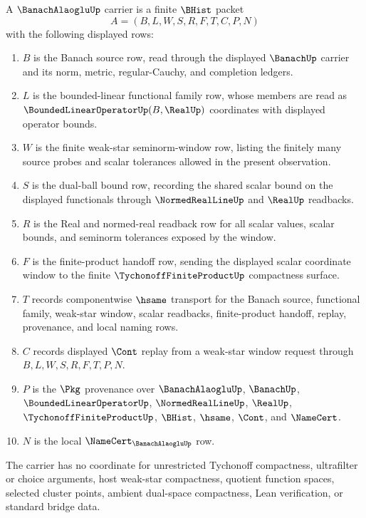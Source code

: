 \begin{definition}
\label{def:banach-alaoglu-carrier}
A $\BanachAlaogluUp$ carrier is a finite $\BHist$ packet
$$
A=(B,L,W,S,R,F,T,C,P,N)
$$
with the following displayed rows:
\begin{enumerate}
\item $B$ is the Banach source row, read through the displayed $\BanachUp$ carrier and its norm, metric, regular-Cauchy, and completion ledgers.
\item $L$ is the bounded-linear functional family row, whose members are read as $\BoundedLinearOperatorUp(B,\RealUp)$ coordinates with displayed operator bounds.
\item $W$ is the finite weak-star seminorm-window row, listing the finitely many source probes and scalar tolerances allowed in the present observation.
\item $S$ is the dual-ball bound row, recording the shared scalar bound on the displayed functionals through $\NormedRealLineUp$ and $\RealUp$ readbacks.
\item $R$ is the Real and normed-real readback row for all scalar values, scalar bounds, and seminorm tolerances exposed by the window.
\item $F$ is the finite-product handoff row, sending the displayed scalar coordinate window to the finite $\TychonoffFiniteProductUp$ compactness surface.
\item $T$ records componentwise $\hsame$ transport for the Banach source, functional family, weak-star window, scalar readbacks, finite-product handoff, replay, provenance, and local naming rows.
\item $C$ records displayed $\Cont$ replay from a weak-star window request through $B,L,W,S,R,F,T,P,N$.
\item $P$ is the $\Pkg$ provenance over $\BanachAlaogluUp$, $\BanachUp$, $\BoundedLinearOperatorUp$, $\NormedRealLineUp$, $\RealUp$, $\TychonoffFiniteProductUp$, $\BHist$, $\hsame$, $\Cont$, and $\NameCert$.
\item $N$ is the local $\NameCert_{\BanachAlaogluUp}$ row.
\end{enumerate}
The carrier has no coordinate for unrestricted Tychonoff compactness, ultrafilter or choice arguments, host weak-star compactness, quotient function spaces, selected cluster points, ambient dual-space compactness, Lean verification, or standard bridge data.
\end{definition}

